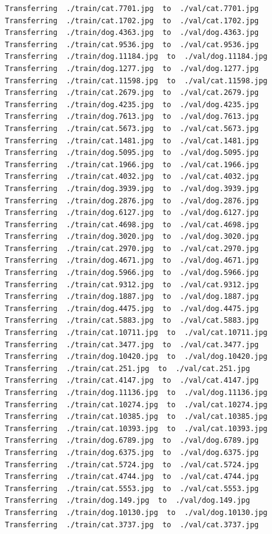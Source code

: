 \documentclass[]{book}
\theoremstyle{definition}
\theoremstyle{definition}
\theoremstyle{definition}
\theoremstyle{remark}
\begin{document}
\begin{verbatim}
Transferring  ./train/cat.7701.jpg  to  ./val/cat.7701.jpg
Transferring  ./train/cat.1702.jpg  to  ./val/cat.1702.jpg
Transferring  ./train/dog.4363.jpg  to  ./val/dog.4363.jpg
Transferring  ./train/cat.9536.jpg  to  ./val/cat.9536.jpg
Transferring  ./train/dog.11184.jpg  to  ./val/dog.11184.jpg
Transferring  ./train/dog.1277.jpg  to  ./val/dog.1277.jpg
Transferring  ./train/cat.11598.jpg  to  ./val/cat.11598.jpg
Transferring  ./train/cat.2679.jpg  to  ./val/cat.2679.jpg
Transferring  ./train/dog.4235.jpg  to  ./val/dog.4235.jpg
Transferring  ./train/dog.7613.jpg  to  ./val/dog.7613.jpg
Transferring  ./train/cat.5673.jpg  to  ./val/cat.5673.jpg
Transferring  ./train/cat.1481.jpg  to  ./val/cat.1481.jpg
Transferring  ./train/dog.5095.jpg  to  ./val/dog.5095.jpg
Transferring  ./train/cat.1966.jpg  to  ./val/cat.1966.jpg
Transferring  ./train/cat.4032.jpg  to  ./val/cat.4032.jpg
Transferring  ./train/dog.3939.jpg  to  ./val/dog.3939.jpg
Transferring  ./train/dog.2876.jpg  to  ./val/dog.2876.jpg
Transferring  ./train/dog.6127.jpg  to  ./val/dog.6127.jpg
Transferring  ./train/cat.4698.jpg  to  ./val/cat.4698.jpg
Transferring  ./train/dog.3020.jpg  to  ./val/dog.3020.jpg
Transferring  ./train/cat.2970.jpg  to  ./val/cat.2970.jpg
Transferring  ./train/dog.4671.jpg  to  ./val/dog.4671.jpg
Transferring  ./train/dog.5966.jpg  to  ./val/dog.5966.jpg
Transferring  ./train/cat.9312.jpg  to  ./val/cat.9312.jpg
Transferring  ./train/dog.1887.jpg  to  ./val/dog.1887.jpg
Transferring  ./train/dog.4475.jpg  to  ./val/dog.4475.jpg
Transferring  ./train/cat.5883.jpg  to  ./val/cat.5883.jpg
Transferring  ./train/cat.10711.jpg  to  ./val/cat.10711.jpg
Transferring  ./train/cat.3477.jpg  to  ./val/cat.3477.jpg
Transferring  ./train/dog.10420.jpg  to  ./val/dog.10420.jpg
Transferring  ./train/cat.251.jpg  to  ./val/cat.251.jpg
Transferring  ./train/cat.4147.jpg  to  ./val/cat.4147.jpg
Transferring  ./train/dog.11136.jpg  to  ./val/dog.11136.jpg
Transferring  ./train/cat.10274.jpg  to  ./val/cat.10274.jpg
Transferring  ./train/cat.10385.jpg  to  ./val/cat.10385.jpg
Transferring  ./train/cat.10393.jpg  to  ./val/cat.10393.jpg
Transferring  ./train/dog.6789.jpg  to  ./val/dog.6789.jpg
Transferring  ./train/dog.6375.jpg  to  ./val/dog.6375.jpg
Transferring  ./train/cat.5724.jpg  to  ./val/cat.5724.jpg
Transferring  ./train/cat.4744.jpg  to  ./val/cat.4744.jpg
Transferring  ./train/cat.5553.jpg  to  ./val/cat.5553.jpg
Transferring  ./train/dog.149.jpg  to  ./val/dog.149.jpg
Transferring  ./train/dog.10130.jpg  to  ./val/dog.10130.jpg
Transferring  ./train/cat.3737.jpg  to  ./val/cat.3737.jpg

\end{verbatim}
\end{document}
